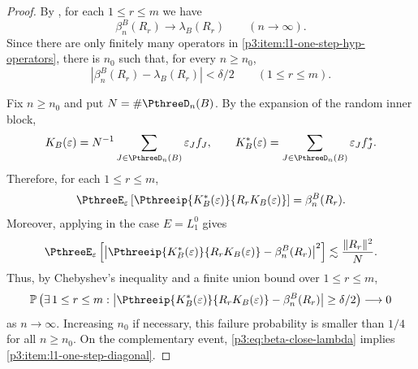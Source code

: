 \documentclass[11pt,reqno]{amsart}
\makeatletter
\theoremstyle{plain}
\theoremstyle{definition}
\newcounter{problempaper}
\newenvironment{problempaperbody}{%
  \setcounter{subsection}{0}%
  \setcounter{subsubsection}{0}%
  \setcounter{paragraph}{0}%
  \renewcommand{\thesubsection}{\arabic{subsection}}%
  \renewcommand{\thesubsubsection}{\thesubsection.\arabic{subsubsection}}%
  \renewcommand{\theparagraph}{\thesubsubsection.\arabic{paragraph}}%
  \let\problem@outersection\section
  \let\problem@outersubsection\subsection
  \let\problem@outersubsubsection\subsubsection
  \let\problem@outerparagraph\paragraph
  \let\section\problem@papersection
  \let\subsection\problem@papersubsection
  \let\subsubsection\problem@papersubsubsection
}{%
  \let\section\problem@outersection
  \let\subsection\problem@outersubsection
  \let\subsubsection\problem@outersubsubsection
  \let\paragraph\problem@outerparagraph
}
\newcommand{\problem@target}[2]{%
  \hypertarget{problem-\theproblempaper-#1-#2}{}%
}
\newcommand{\problem@paperheading}[3]{%
  \par\bigskip
  \problem@target{#1}{#2}%
  \noindent{\large\bfseries #2.\quad #3\par}%
  \nobreak\smallskip
}
\newcommand{\problem@papersubheading}[3]{%
  \par\medskip
  \problem@target{#1}{#2}%
  \noindent{\normalsize\bfseries #2.\quad #3\par}%
  \nobreak\smallskip
}
\newcommand{\problem@papersubsubheading}[3]{%
  \par\smallskip
  \problem@target{#1}{#2}%
  \noindent{\normalsize\itshape #2.\quad #3.\ }%
}
\def\problem@papersection{%
  \@ifstar{\problem@papersectionstar}{\problem@papersectionnostar}%
}
\def\problem@papersectionstar#1{%
  \par\bigskip\noindent{\large\bfseries #1\par}\nobreak\smallskip
}
\def\problem@papersectionnostar#1{%
  \refstepcounter{subsection}%
  \setcounter{subsubsection}{0}%
  \setcounter{paragraph}{0}%
  \problem@paperheading{section}{\thesubsection}{#1}%
  \problem@writecontentsline{section}{\thesubsection}{#1}%
}
\def\problem@papersubsection{%
  \@ifstar{\problem@papersubsectionstar}{\problem@papersubsectionnostar}%
}
\def\problem@papersubsectionstar#1{%
  \par\medskip\noindent{\normalsize\bfseries #1\par}\nobreak\smallskip
}
\def\problem@papersubsectionnostar#1{%
  \refstepcounter{subsubsection}%
  \setcounter{paragraph}{0}%
  \problem@papersubheading{subsection}{\thesubsubsection}{#1}%
  \problem@writecontentsline{subsection}{\thesubsubsection}{#1}%
}
\def\problem@papersubsubsection{%
  \@ifstar{\problem@papersubsubsectionstar}{\problem@papersubsubsectionnostar}%
}
\def\problem@papersubsubsectionstar#1{%
  \par\smallskip\noindent{\normalsize\itshape #1.\ }%
}
\def\problem@papersubsubsectionnostar#1{%
  \refstepcounter{paragraph}%
  \problem@papersubsubheading{subsubsection}{\theparagraph}{#1}%
  \problem@writecontentsline{subsubsection}{\theparagraph}{#1}%
}
\newcommand{\problem@writecontentsline}[3]{%
  \begingroup
  \protected@write\@auxout{}{%
    \string\problemcontentsentry{\theproblempaper}{#1}{#2}{#3}{\thepage}%
  }%
  \endgroup
}
\newcommand{\problemcontentsentry}[5]{%
  \@ifundefined{problemcontents@#1}{%
    \expandafter\gdef\csname problemcontents@#1\endcsname{}%
  }{}%
  \expandafter\g@addto@macro\csname problemcontents@#1\endcsname{%
    \problemcontentsline{#1}{#2}{#3}{#4}{#5}%
  }%
}
\newcommand{\problemcontentslink}[4]{%
  \hyperlink{problem-#1-#2-#3}{#4}%
}
\newcommand{\problemcontentsline}[5]{%
  \ifstrequal{#2}{section}{%
    \par\noindent
    \problemcontentslink{#1}{#2}{#3}{\makebox[2.5em][l]{#3}#4}%
    \nobreak\dotfill
    \problemcontentslink{#1}{#2}{#3}{#5}\par
  }{%
    \ifstrequal{#2}{subsection}{%
      \par\noindent\hspace*{1.5em}%
      \problemcontentslink{#1}{#2}{#3}{\makebox[3.5em][l]{#3}#4}%
      \nobreak\dotfill
      \problemcontentslink{#1}{#2}{#3}{#5}\par
    }{%
      \par\noindent\hspace*{3em}%
      \problemcontentslink{#1}{#2}{#3}{\makebox[4.5em][l]{#3}#4}%
      \nobreak\dotfill
      \problemcontentslink{#1}{#2}{#3}{#5}\par
    }%
  }%
}
\makeatother
\begin{document}
\begin{problempaperbody}
\begin{proof}
By , for each $1\leq r\leq m$ we have
\begin{equation*}
        \beta_n^B(R_r)\longrightarrow\lambda_B(R_r)\qquad(n\to\infty).
\end{equation*}
Since there are only finitely many operators in \ref{p3:item:l1-one-step-hyp-operators}, there is $n_0$ such that, for every $n\geq n_0$,
\begin{equation}
\label{p3:eq:beta-close-lambda}
        |\beta_n^B(R_r)-\lambda_B(R_r)|<\delta/2\qquad(1\leq r\leq m).
\end{equation}

Fix $n\geq n_0$ and put $N=\#\PthreeD_n(B)$. By the expansion of the random inner block,
\begin{equation*}
        K_B(\varepsilon)=N^{-1}\sum_{J\in\PthreeD_n(B)}\varepsilon_Jf_J,\qquad K_B^*(\varepsilon)=\sum_{J\in\PthreeD_n(B)}\varepsilon_Jf_J^*.
\end{equation*}
Therefore, for each $1\leq r\leq m$,
\begin{equation*}
        \PthreeE_\varepsilon\left[\Pthreeip{K_B^*(\varepsilon)}{R_rK_B(\varepsilon)}\right]=\beta_n^B(R_r).
\end{equation*}
Moreover, applying  in the case $E=L_1^0$ gives
\begin{equation*}
        \PthreeE_\varepsilon\left[\left|\Pthreeip{K_B^*(\varepsilon)}{R_rK_B(\varepsilon)}-\beta_n^B(R_r)\right|^2\right]\lesssim\frac{\|R_r\|^2}{N}.
\end{equation*}
Thus, by Chebyshev's inequality and a finite union bound over $1\leq r\leq m$,
\begin{equation*}
        \mathbb P\left(\exists\,1\leq r\leq m:\left|\Pthreeip{K_B^*(\varepsilon)}{R_rK_B(\varepsilon)}-\beta_n^B(R_r)\right|\geq\delta/2\right)\longrightarrow0
\end{equation*}
as $n\to\infty$. Increasing $n_0$ if necessary, this failure probability is smaller than $1/4$ for all $n\geq n_0$. On the complementary event, \eqref{p3:eq:beta-close-lambda} implies \ref{p3:item:l1-one-step-diagonal}.


\end{proof}
\end{problempaperbody}
\end{document}
